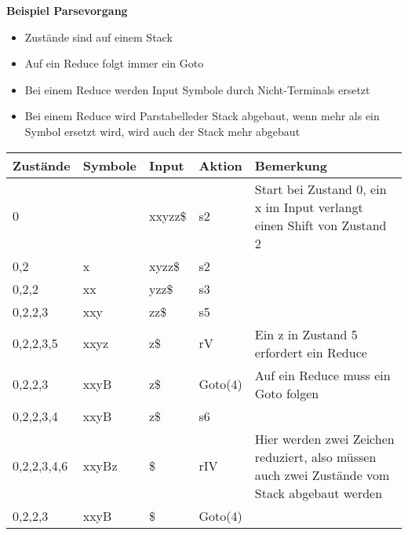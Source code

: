 \textbf{Beispiel Parsevorgang}
\begin{itemize}
	\item Zustände sind auf einem Stack
	\item Auf ein Reduce folgt immer ein Goto
	\item Bei einem Reduce werden Input Symbole durch Nicht-Terminals ersetzt
	\item Bei einem Reduce wird Parstabelleder Stack abgebaut, wenn mehr als ein Symbol ersetzt wird, wird auch der Stack mehr abgebaut
\end{itemize}

\begin{table}[h]
    \begin{tabular}{|l|l|l|l|p{7cm}|}
    \hline
    Zustände    & Symbole & Input  & Aktion  & Bemerkung                                                                                    \\ \hline
    0           & ~       & xxyzz\$ & s2      & Start bei Zustand 0, ein x im Input verlangt einen Shift von Zustand 2                       \\ \hline
    0,2         & x       & xyzz\$ & s2      & ~                                                                                            \\ \hline
    0,2,2       & xx      & yzz\$  & s3      & ~                                                                                            \\ \hline
    0,2,2,3     & xxy     & zz\$   & s5      & ~                                                                                            \\ \hline
    0,2,2,3,5   & xxyz    & z\$    & rV      & Ein z in Zustand 5 erfordert ein Reduce                                                      \\ \hline
    0,2,2,3     & xxyB    & z\$    & Goto(4) & Auf ein Reduce muss ein Goto folgen                                                          \\ \hline
    0,2,2,3,4   & xxyB    & z\$    & s6      & ~                                                                                            \\ \hline
    0,2,2,3,4,6 & xxyBz   & \$     & rIV     & Hier werden zwei Zeichen reduziert, also müssen auch zwei Zustände vom Stack abgebaut werden \\ \hline
    0,2,2,3     & xxyB    & \$     & Goto(4) & ~                                                                                            \\ \hline

\end{tabular}
\end{table}
